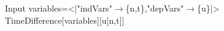 \begin{mmaCell}[moredefined={variables, expression, TimeDifference}]{Input}
  variables=<|"indVars"\(\pmb{\to}\)\{n,t\},"depVars"\(\pmb{\to}\)\{u\}|>
  TimeDifference[variables][u[n,t]]
  
\end{mmaCell}